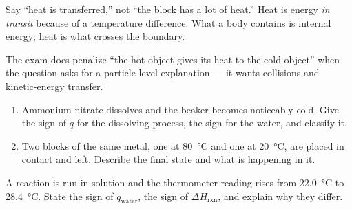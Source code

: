 \documentclass{apchem-notes}
\begin{document}
\begin{apcnote}
Say ``heat is transferred,'' not ``the block has a lot of heat.'' Heat is
energy \emph{in transit} because of a temperature difference. What a body
contains is internal energy; heat is what crosses the boundary.

The exam does penalize ``the hot object gives its heat to the cold object''
when the question asks for a particle-level explanation --- it wants
collisions and kinetic-energy transfer.
\end{apcnote}


\begin{enumerate}[leftmargin=*,itemsep=0.4em]
  \item Ammonium nitrate dissolves and the beaker becomes noticeably cold.
        Give the sign of $q$ for the dissolving process, the sign for the
        water, and classify it. 
  \item Two blocks of the same metal, one at \SI{80}{\celsius} and one at
        \SI{20}{\celsius}, are placed in contact and left. Describe the
        final state and what is happening in it. 
\end{enumerate}

\begin{exitticket}
A reaction is run in solution and the thermometer reading rises from
\SI{22.0}{\celsius} to \SI{28.4}{\celsius}. State the sign of
$q_{\text{water}}$, the sign of $\Delta H_{\text{rxn}}$, and explain why
they differ.
\end{exitticket}
\end{document}
